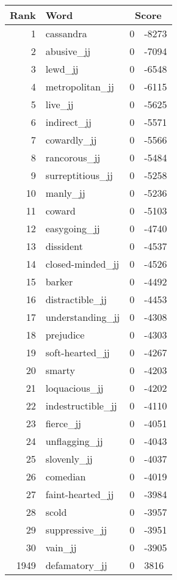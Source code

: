 \begin{longtable}[!htbp]{| rlr@{.}l |}
    \hline
    \textbf{Rank} & \textbf{Word} & \multicolumn{2}{c|}{\textbf{Score}} \\
    \hline
    \endhead
    1 & cassandra & 0 & -8273 \\
    2 & abusive\_jj & 0 & -7094 \\
    3 & lewd\_jj & 0 & -6548 \\
    4 & metropolitan\_jj & 0 & -6115 \\
    5 & live\_jj & 0 & -5625 \\
    6 & indirect\_jj & 0 & -5571 \\
    7 & cowardly\_jj & 0 & -5566 \\
    8 & rancorous\_jj & 0 & -5484 \\
    9 & surreptitious\_jj & 0 & -5258 \\
    10 & manly\_jj & 0 & -5236 \\
    11 & coward & 0 & -5103 \\
    12 & easygoing\_jj & 0 & -4740 \\
    13 & dissident & 0 & -4537 \\
    14 & closed-minded\_jj & 0 & -4526 \\
    15 & barker & 0 & -4492 \\
    16 & distractible\_jj & 0 & -4453 \\
    17 & understanding\_jj & 0 & -4308 \\
    18 & prejudice & 0 & -4303 \\
    19 & soft-hearted\_jj & 0 & -4267 \\
    20 & smarty & 0 & -4203 \\
    21 & loquacious\_jj & 0 & -4202 \\
    22 & indestructible\_jj & 0 & -4110 \\
    23 & fierce\_jj & 0 & -4051 \\
    24 & unflagging\_jj & 0 & -4043 \\
    25 & slovenly\_jj & 0 & -4037 \\
    26 & comedian & 0 & -4019 \\
    27 & faint-hearted\_jj & 0 & -3984 \\
    28 & scold & 0 & -3957 \\
    29 & suppressive\_jj & 0 & -3951 \\
    30 & vain\_jj & 0 & -3905 \\
    1949 & defamatory\_jj & 0 & 3816 \\

\end{longtable}
